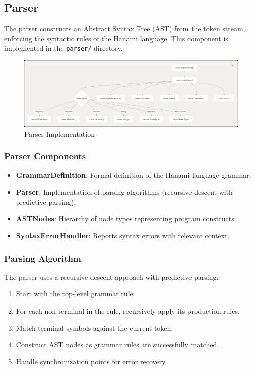 \documentclass[conference]{IEEEtran}
\begin{document}
\subsection{Parser}
The parser constructs an Abstract Syntax Tree (AST) from the token stream, enforcing the syntactic rules of the Hanami language. This component is implemented in the \texttt{parser/} directory.
\begin{figure}[H]
    \centering
    \includegraphics[width=1\linewidth]{lexer_imp}
    \caption{Parser Implementation}
    \label{fig:enter-label}
\end{figure}
\subsubsection{Parser Components}
\begin{itemize}
    \item \textbf{GrammarDefinition}: Formal definition of the Hanami language grammar.
    \item \textbf{Parser}: Implementation of parsing algorithms (recursive descent with predictive parsing).
    \item \textbf{ASTNodes}: Hierarchy of node types representing program constructs.
    \item \textbf{SyntaxErrorHandler}: Reports syntax errors with relevant context.
\end{itemize}

\subsubsection{Parsing Algorithm}
The parser uses a recursive descent approach with predictive parsing:
\begin{enumerate}
    \item Start with the top-level grammar rule.
    \item For each non-terminal in the rule, recursively apply its production rules.
    \item Match terminal symbols against the current token.
    \item Construct AST nodes as grammar rules are successfully matched.
    \item Handle synchronization points for error recovery.
\end{enumerate}
\end{document}

